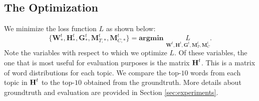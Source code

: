 \subsection{The Optimization}
We minimize the loss function $L$ as shown below:
\begin{equation}
\{\mathbf{W}^t_*, \mathbf{H}^t_*, \mathbf{G}^t_*, \mathbf{M}_{T,*}^t, \mathbf{M}_{C,*}^t\} =  \textbf{argmin } \underset{\mathbf{W}^t,\mathbf{H}^t,\mathbf{G}^t,\mathbf{M}_T^t, \mathbf{M}_C^t}  L. \label{eq:optimization}
\end{equation}
Note the variables with respect to which we optimize $L$.  Of these variables, the one that is most useful for evaluation
purposes is the matrix $\textbf{H}^t$.  This is a matrix of word distributions for each topic.  We compare the top-$10$ words from
each topic in $\textbf{H}^t$ to the top-$10$ obtained from the groundtruth.  More details about groundtruth and evaluation
are provided in Section \ref{sec:experiments}.

